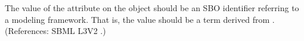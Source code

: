 The value of the attribute  on the \SBML object should be
an SBO identifier referring to a modeling framework.  That is, the
value should be a term derived from \sboframework.  (References: SBML
 L3V2 .)
